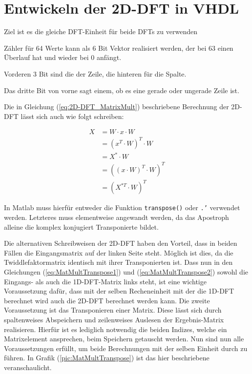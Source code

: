 \section{Entwickeln der 2D-DFT in VHDL}

Ziel ist es die gleiche DFT-Einheit für beide DFTs zu verwenden

Zähler für 64 Werte kann als 6 Bit Vektor realisiert werden, der bei 63 einen Überlauf hat und wieder bei 0 anfängt.

Vorderen 3 Bit sind die der Zeile, die hinteren für die Spalte.

Das dritte Bit von vorne sagt einem, ob es eine gerade oder ungerade Zeile ist.


 
 
 
Die in Gleichung (\ref{eq:2D-DFT_MatrixMult}) beschriebene Berechnung der 2D-DFT lässt sich auch wie folgt schreiben:

\begin{align}
 X &= W \cdot x \cdot W \nonumber \\
   &= \left(x^T\cdot W\right)^T\cdot W \label{eq:MatMultTranspose1} \\
   &= X^* \cdot W \nonumber\\
   &= \left(\left(x\cdot W\right)^T\cdot W\right)^T \label{eq:MatMultTranspose2}\\
   &= \left(X^{*T} \cdot W\right)^T \nonumber
\end{align}

In Matlab muss hierfür entweder die Funktion \texttt{transpose()} oder \texttt{.'} verwendet werden. Letzteres muss elementweise angewandt werden, da das Apostroph
alleine die komplex konjugiert Transponierte bildet.

Die alternativen Schreibweisen der 2D-DFT haben den Vorteil, dass in beiden Fällen die Eingangsmatrix auf der linken Seite steht. Möglich ist dies, da die 
Twiddlefaktormatrix identisch mit ihrer Transponierten ist.
Dass nun in den Gleichungen (\ref{eq:MatMultTranspose1}) und (\ref{eq:MatMultTranspose2}) sowohl die Eingangs- als auch die 1D-DFT-Matrix links steht, ist eine wichtige 
Voraussetzung dafür, dass mit der selben Recheneinheit mit der die 1D-DFT berechnet wird auch die 2D-DFT berechnet werden kann.
Die zweite Voraussetzung ist das Transponieren einer Matrix. Diese lässt sich durch spaltenweises Abspeichern und zeilenweises Auslesen der Ergebnis-Matrix realisieren.
Hierfür ist es lediglich notwendig die beiden Indizes, welche ein Matrixelement ansprechen, beim Speichern getauscht werden. Nun sind nun alle Voraussetzungen erfüllt, 
um beide Berechnungen mit der selben Einheit durch zu führen. In Grafik (\ref{pic:MatMultTranspose}) ist das hier beschriebene veranschaulicht.

